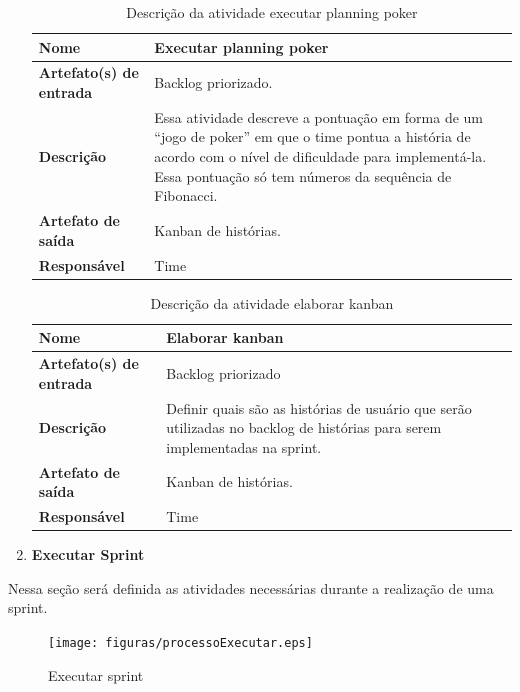 \begin{enumerate}
    \begin{table}[H]
        \centering
        \label{descricaoAtividades20}
        \caption{Descrição da atividade executar planning poker}
            \begin{tabular}{|l|p{10cm}|}
            \hline
            \textbf{Nome} & Executar planning poker \\
            \hline
            \textbf{Artefato(s) de entrada} & Backlog priorizado. \\
            \hline
            \textbf{Descrição} & Essa atividade descreve a pontuação em forma de um “jogo de poker” em que o time pontua a história de acordo com o nível de dificuldade para implementá-la. Essa pontuação só tem números da sequência de Fibonacci. \\
            \hline
            \textbf{Artefato de saída} & Kanban de histórias. \\
            \hline
            \textbf{Responsável} & Time \\
            \hline
        \end{tabular}
    \end{table}

    \begin{table}[H]
        \centering
        \label{descricaoAtividades20}
        \caption{Descrição da atividade elaborar kanban}
            \begin{tabular}{|l|p{10cm}|}
            \hline
            \textbf{Nome} & Elaborar kanban \\
            \hline
            \textbf{Artefato(s) de entrada} & Backlog priorizado \\
            \hline
            \textbf{Descrição} & Definir quais são as histórias de usuário que serão utilizadas no backlog de histórias para serem implementadas na sprint. \\
            \hline
            \textbf{Artefato de saída} & Kanban de histórias. \\
            \hline
            \textbf{Responsável} & Time \\
            \hline
        \end{tabular}
    \end{table}

    \item \textbf{Executar Sprint}
    \end{enumerate}
    Nessa seção será definida as atividades necessárias durante a realização de uma sprint.

    \begin{figure}[H]
        \centering
        \caption{Executar sprint}
        \label{processoExecutar}
        \texttt{[image: figuras/processoExecutar.eps]}
    \end{figure}

